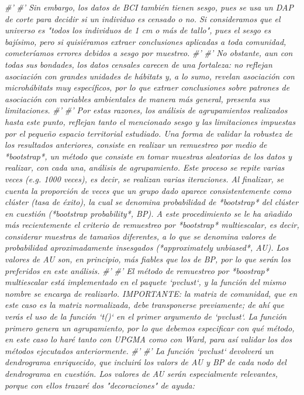 \documentclass[11pt,]{article}
\newenvironment{Shaded}{\begin{snugshade}}{\end{snugshade}}
\newcommand{\CommentTok}[1]{\textcolor[rgb]{0.56,0.35,0.01}{\textit{#1}}}
\begin{document}
\begin{Shaded}
\begin{Highlighting}[]
{{{\CommentTok{#' }
\CommentTok{#' Sin embargo, los datos de BCI también tienen sesgo, pues se usa un DAP de corte para decidir si un individuo es censado o no. Si consideramos que el universo es "todos los individuos de 1 cm o más de tallo", pues el sesgo es bajísimo, pero si quisiéramos extraer conclusiones aplicadas a toda comunidad, cometeríamos errores debidos a sesgo por muestreo.}
\CommentTok{#' }
\CommentTok{#' No obstante, aun con todas sus bondades, los datos censales carecen de una fortaleza: no reflejan asociación con grandes unidades de hábitats y, a lo sumo, revelan asociación con microhábitats muy específicos, por lo que extraer conclusiones sobre patrones de asociación con variables ambientales de manera más general, presenta sus limitaciones.}
\CommentTok{#' }
\CommentTok{#' Por estas razones, los análisis de agrupamientos realizados hasta este punto, reflejan tanto el mencionado sesgo y las limitaciones impuestas por el pequeño espacio territorial estudiado. Una forma de validar la robustez de los resultados anteriores, consiste en realizar un remuestreo por medio de *bootstrap*, un método que consiste en tomar muestras aleatorias de los datos y realizar, con cada una, análisis de agrupamiento. Este proceso se repite varias veces (e.g. 1000 veces), es decir, se realizan varias iteraciones. Al finalizar, se cuenta la proporción de veces que un grupo dado aparece consistentemente como clúster (tasa de éxito), la cual se denomina probabilidad de *bootstrap* del clúster en cuestión (*bootstrap probability*, BP). A este procedimiento se le ha añadido más recientemente el criterio de remuestreo por *bootstrap* multiescalar, es decir, considerar muestras de tamaños diferentes, a lo que se denomina valores de probabilidad aproximadamente insesgados (*approximately unbiased*, AU). Los valores de AU son, en principio, más fiables que los de BP, por lo que serán los preferidos en este análisis.}
\CommentTok{#' }
\CommentTok{#' El método de remuestreo por *boostrap* multiescalar está implementado en el paquete `pvclust`, y la función del mismo nombre se encarga de realizarlo. IMPORTANTE: la matriz de comunidad, que en este caso es la matriz normalizada, debe transponerse previamente; de ahí que verás el uso de la función `t()` en el primer argumento de `pvclust`. La función primero genera un agrupamiento, por lo que debemos especificar con qué método, en este caso lo haré tanto con UPGMA como con Ward, para así validar los dos métodos ejecutados anteriormente.}
\CommentTok{#' }
\CommentTok{#' La función `pvclust` devolverá un dendrograma enriquecido, que incluirá los valors de AU y BP de cada nodo del dendrograma en cuestión. Los valores de AU serán especialmente relevantes, porque con ellos trazaré dos "decoraciones" de ayuda:}
}}}
\end{Highlighting}
\end{Shaded}
\end{document}
